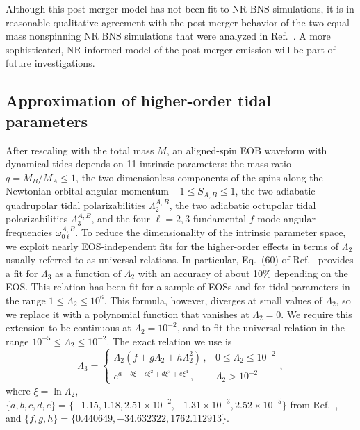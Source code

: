\documentclass[prd,aps,letter,twocolumn,floatfix,notitlepage,nofootinbib]{revtex4-1}
\begin{document}
Although this post-merger model has not been fit to NR BNS simulations, it is in reasonable qualitative agreement with the post-merger behavior of the two equal-mass nonspinning NR BNS simulations that were analyzed in Ref.~\cite{Hinderer:2016eia}. A more sophisticated, NR-informed model of the post-merger emission will be part of future investigations.


\subsection{Approximation of higher-order tidal parameters}

After rescaling with the total mass $M$, an aligned-spin EOB waveform with dynamical tides depends on 11 intrinsic parameters: the mass ratio $q=M_B/M_A\leq1$, the two dimensionless components of the spins along the Newtonian orbital angular momentum $-1 \leq S_{A,B} \leq 1$, the two adiabatic quadrupolar tidal polarizabilities $\Lambda_2^{A,B}$, the two adiabatic octupolar tidal polarizabilities $\Lambda_3^{A,B}$, and the four $\ell=2,3$ fundamental $f$-mode angular frequencies $\omega_{0\ell}^{A,B}$. To reduce the dimensionality of the intrinsic parameter space, we exploit nearly EOS-independent fits for the higher-order effects in terms of $\Lambda_2$ usually referred to as universal relations. In particular, Eq.~(60) of Ref.~\cite{Yagi:2013sva} provides a fit for $\Lambda_3$ as a function of $\Lambda_2$ with an accuracy of about 10\% depending on the EOS. This relation has been fit for a sample of EOSs and for tidal parameters in the range $1 \leq \Lambda_2\leq10^6$. This formula, however, diverges at small values of $\Lambda_2$, so we replace it with a polynomial function that vanishes at $\Lambda_2 = 0$. We require this extension to be continuous at $\Lambda_2 = 10^{-2}$, and to fit the universal relation in the range $10^{-5}\leq\Lambda_2\leq10^{-2}$. The exact relation we use is
\begin{equation}
\Lambda_3 = \left\{\begin{array}{ll}
\Lambda_2 (f + g \Lambda_2 + h \Lambda_2^2)\, , & 0 \leq \Lambda_2 \leq 10^{-2} \\
e^{a + b \xi + c \xi^2 + d \xi^3 + e \xi^4}\, , & \Lambda_2>10^{-2}
\end{array}\right.,
\end{equation}
where $\xi = \ln\Lambda_2$, $\{a, b, c, d, e\} = \{-1.15, 1.18, 2.51\times 10^{-2}, -1.31\times 10^{-3}, 2.52\times 10^{-5}\}$ from Ref.~\cite{Yagi:2013sva}, and $\{f, g, h\}=\{0.440649, -34.632322, 1762.112913\}$.
\end{document}
